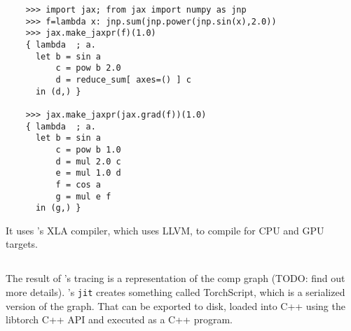 \documentclass[paper=a4,11pt,headsepline]{scrartcl}
\begin{document}
\begin{verbatim}
    >>> import jax; from jax import numpy as jnp
    >>> f=lambda x: jnp.sum(jnp.power(jnp.sin(x),2.0))
    >>> jax.make_jaxpr(f)(1.0)
    { lambda  ; a.
      let b = sin a
          c = pow b 2.0
          d = reduce_sum[ axes=() ] c
      in (d,) }

    >>> jax.make_jaxpr(jax.grad(f))(1.0)
    { lambda  ; a.
      let b = sin a
          c = pow b 1.0
          d = mul 2.0 c
          e = mul 1.0 d
          f = cos a
          g = mul e f
      in (g,) }
\end{verbatim}

It uses \tf's XLA compiler, which uses LLVM, to compile for CPU and GPU targets.

\subsection{\pytorch}

The result of \pytorch's tracing is a representation of the comp graph (TODO:
find out more details). \pytorch's \texttt{jit} creates something called
TorchScript, which is a serialized version of the graph. That can be exported
to disk, loaded into C++ using the libtorch C++ API and executed as a C++
program.

\nocite{*}
\printbibliography
\end{document}
